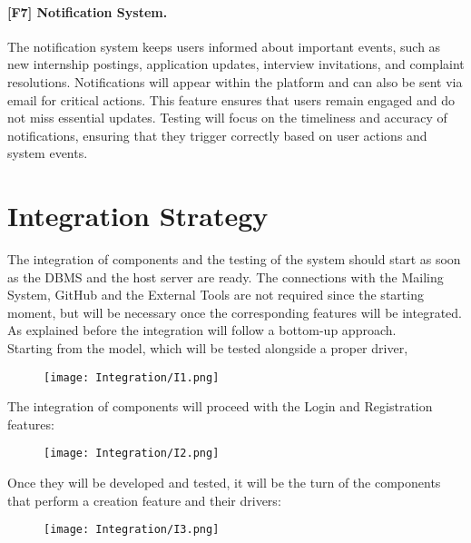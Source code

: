 \paragraph{[F7] Notification System.}  The notification system keeps users informed about important events, such as new internship postings, application updates, interview invitations, and complaint resolutions. Notifications will appear within the platform and can also be sent via email for critical actions. This feature ensures that users remain engaged and do not miss essential updates. Testing will focus on the timeliness and accuracy of notifications, ensuring that they trigger correctly based on user actions and system events.

\newpage
\section{Integration Strategy}
The integration of components and the testing of the system should start as soon as the DBMS and the host server are ready. The connections with the Mailing System, GitHub and the External Tools are not required since the starting moment, but will be necessary once the corresponding features will be integrated. As explained before the integration will follow a bottom-up approach.
\\
Starting from the model, which will be tested alongside a proper driver, 


\begin{figure}[H]
    \begin{center}
        \texttt{[image: Integration/I1.png]}
        \label{fig:Integration_1}%
    \end{center}
\end{figure}


The integration of components will proceed with the Login and Registration features:

\begin{figure}[H]
    \begin{center}
        \texttt{[image: Integration/I2.png]}
        \label{fig:Integration_2}%
    \end{center}
\end{figure}

Once they will be developed and tested, it will be the turn of the components that perform a creation feature and their drivers:

\begin{figure}[H]
    \begin{center}
        \texttt{[image: Integration/I3.png]}
        \label{fig:Integration_3}%
    \end{center}
\end{figure}

